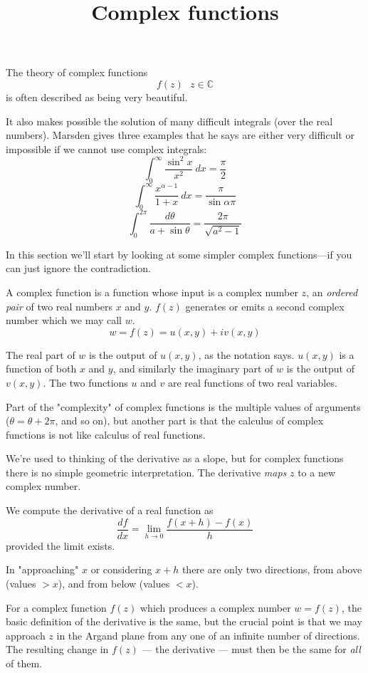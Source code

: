 \documentclass[11pt, oneside]{article}   	%
\title{Complex functions}
\date{}							%
\begin{document}
\maketitle
\Large

The theory of complex functions
\[ f(z) \ \ \  z \in \mathbb{C} \]
is often described as being very beautiful.

It also makes possible the solution of many difficult integrals (over the real numbers).  Marsden gives three examples that he says are either very difficult or impossible if we cannot use complex integrals:
\[ \int_0^{\infty} \frac{\sin^2 x}{x^2} \ dx = \frac{\pi}{2} \]
\[ \int_0^{\infty} \frac{x^{\alpha-1}}{1+x} \ dx = \frac{\pi}{\sin \alpha \pi} \]
\[ \int_0^{2 \pi} \frac{d \theta}{a + \sin \theta} = \frac{2 \pi}{\sqrt{a^2-1}} \]

In this section we'll start by looking at some simpler complex functions---if you can just ignore the contradiction.

A complex function is a function whose input is a complex number $z$, an \emph{ordered pair} of two real numbers $x$ and $y$.  $f(z)$ generates or emits a second complex number which we may call $w$.
\[ w = f(z) = u(x,y) + i v(x,y) \]

The real part of $w$ is the output of $u(x,y)$, as the notation says.  $u(x,y)$ is a function of both $x$ and $y$, and similarly the imaginary part of $w$ is the output of $v(x,y)$.  The two functions $u$ and $v$ are real functions of two real variables.

Part of the "complexity" of complex functions is the multiple values of arguments ($\theta = \theta + 2 \pi$, and so on), but another part is that the calculus of complex functions is not like calculus of real functions.

We're used to thinking of the derivative as a slope, but for complex functions there is no simple geometric interpretation.  The derivative \emph{maps} $z$ to a new complex number. 

We compute the derivative of a real function as
\[ \frac{df}{dx} = \lim_{h \rightarrow 0} \frac{f(x+h) - f(x)}{h} \]
provided the limit exists.

In "approaching" $x$ or considering $x+h$ there are only two directions, from above (values $> x$), and from below (values $< x$).

For a complex function $f(z)$ which produces a complex number $w = f(z)$, the basic definition of the derivative is the same, but the crucial point is that we may approach $z$ in the Argand plane from any one of an infinite number of directions.  The resulting change in $f(z)$ --- the derivative --- must then be the same for \emph{all} of them.  
\end{document}
